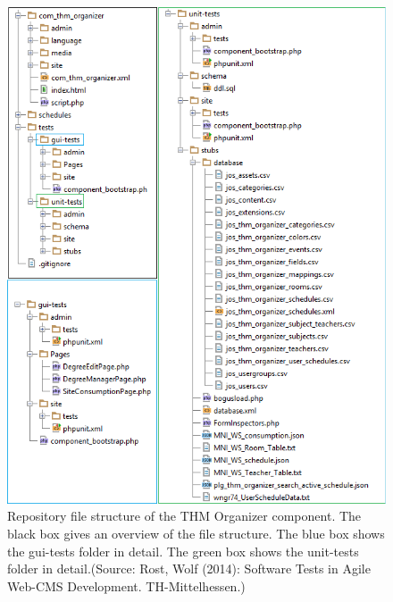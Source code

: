 \begin{figure}
\centering
\includegraphics[scale=0.80]{images/test folder structure}
\caption[Caption for LOF]{Repository file structure of the THM Organizer component. The black box gives an overview of the file structure. The blue box shows the gui-tests folder in detail. The green box shows the unit-tests folder in detail.{\footnotesize (Source: Rost, Wolf (2014): Software Tests in Agile Web-CMS Development. TH-Mittelhessen.)}}

\label{test_folder_structure}
\end{figure}


